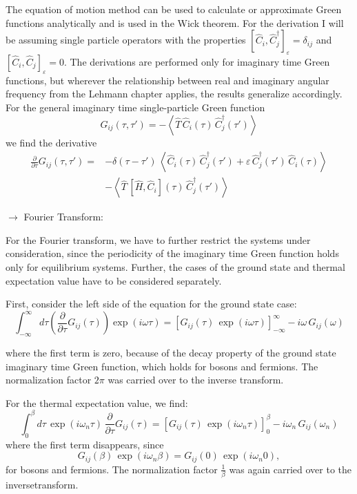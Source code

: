 The equation of motion method can be used to calculate or approximate Green functions analytically and is used in the Wick theorem. For the derivation I will be assuming single particle operators with the properties $[\hat{C}_i, \hat{C}_j^{\dagger}]_{\varepsilon} = \delta_{ij}$ and $[\hat{C}_i, \hat{C}_j]_{\varepsilon} = 0$.
The derivations are performed only for imaginary time Green functions, but wherever the relationship between real and imaginary angular frequency from the Lehmann chapter applies, the results generalize accordingly. For the general imaginary time single-particle Green function
\begin{equation*}
    G_{ij}(\tau,\tau') = -\left\langle \hat{T}\, \hat{C}_i(\tau)\, \hat{C}_j^{\dagger}(\tau') \right\rangle
\end{equation*}
we find the derivative
\begin{align*}
    \frac{\partial}{\partial \tau} G_{ij}(\tau,\tau') = &-\delta(\tau-\tau')\, \left\langle \hat{C}_i(\tau)\, \hat{C}_j^{\dagger}(\tau') + \varepsilon\, \hat{C}_j^{\dagger}(\tau')\, \hat{C}_i(\tau) \right\rangle \\
    &-\left\langle \hat{T}\, [\hat{H}, \hat{C}_i](\tau)\, \hat{C}_j^{\dagger}(\tau') \right\rangle
\end{align*}

$\rightarrow$ Fourier Transform:

For the Fourier transform, we have to further restrict the systems under consideration, since the periodicity of the imaginary time Green function holds only for equilibrium systems.
Further, the cases of the ground state and thermal expectation value have to be considered separately.

First, consider the left side of the equation for the ground state case:
\begin{equation*}
    \int_{-\infty}^{\infty} d\tau \left( \frac{\partial}{\partial \tau} G_{ij}(\tau) \right) \exp(i\omega\tau) = \left[ G_{ij}(\tau)\, \exp(i\omega\tau) \right]_{-\infty}^{\infty} - i\omega\, G_{ij}(\omega)
\end{equation*}

where the first term is zero, because of the decay property of the ground state imaginary time Green function, which holds for bosons and fermions.
The normalization factor $2\pi$ was carried over to the inverse transform.

For the thermal expectation value, we find:
\begin{equation*}
    \int_0^{\beta} d\tau\, \exp(i\omega_n \tau)\, \frac{\partial}{\partial \tau} G_{ij}(\tau) = \left[ G_{ij}(\tau)\, \exp(i\omega_n \tau) \right]_0^{\beta} - i\omega_n\, G_{ij}(\omega_n)
\end{equation*}
where the first term disappears, since
\begin{equation*}
    G_{ij}(\beta)\, \exp(i\omega_n \beta) = G_{ij}(0)\, \exp(i\omega_n 0),
\end{equation*}
for bosons and fermions. The normalization factor $\frac{1}{\beta}$ was again carried over to the inversetransform.

